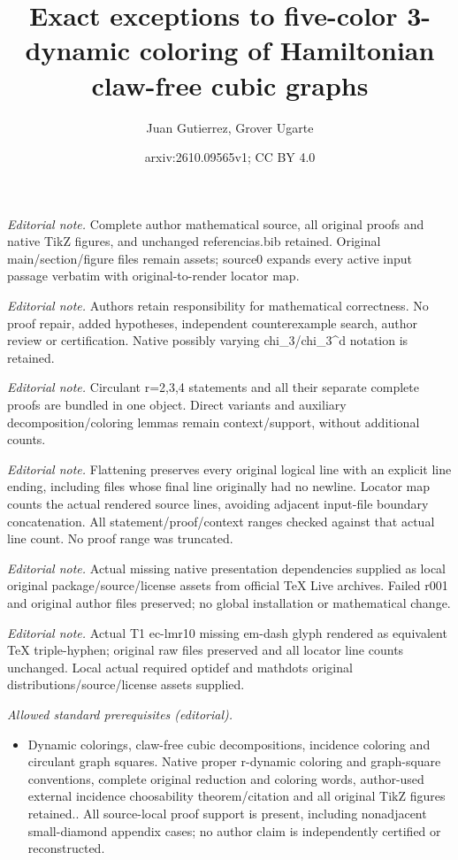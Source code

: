 \documentclass[10pt,a4paper]{article}
\title{Exact exceptions to five-color 3-dynamic coloring of Hamiltonian claw-free cubic graphs}
\author{Juan Gutierrez, Grover Ugarte}
\date{arxiv:2610.09565v1; CC BY 4.0}
\theoremstyle{case}
\numberwithin{subcase}{case}
\begin{document}
\maketitle
\noindent\textit{Editorial note.} Complete author mathematical source, all original proofs and native TikZ figures, and unchanged referencias.bib retained. Original main/section/figure files remain assets; source0 expands every active input passage verbatim with original-to-render locator map.\par\medskip
\noindent\textit{Editorial note.} Authors retain responsibility for mathematical correctness. No proof repair, added hypotheses, independent counterexample search, author review or certification. Native possibly varying chi\_3/chi\_3\textasciicircum{}d notation is retained.\par\medskip
\noindent\textit{Editorial note.} Circulant r=2,3,4 statements and all their separate complete proofs are bundled in one object. Direct variants and auxiliary decomposition/coloring lemmas remain context/support, without additional counts.\par\medskip
\noindent\textit{Editorial note.} Flattening preserves every original logical line with an explicit line ending, including files whose final line originally had no newline. Locator map counts the actual rendered source lines, avoiding adjacent input-file boundary concatenation. All statement/proof/context ranges checked against that actual line count. No proof range was truncated.\par\medskip
\noindent\textit{Editorial note.} Actual missing native presentation dependencies supplied as local original package/source/license assets from official TeX Live archives. Failed r001 and original author files preserved; no global installation or mathematical change.\par\medskip
\noindent\textit{Editorial note.} Actual T1 ec-lmr10 missing em-dash glyph rendered as equivalent TeX triple-hyphen; original raw files preserved and all locator line counts unchanged. Local actual required optidef and mathdots original distributions/source/license assets supplied.\par\medskip
\noindent\textit{Allowed standard prerequisites (editorial).}\begin{itemize}
\item Dynamic colorings, claw-free cubic decompositions, incidence coloring and circulant graph squares. Native proper r-dynamic coloring and graph-square conventions, complete original reduction and coloring words, author-used external incidence choosability theorem/citation and all original TikZ figures retained.. All source-local proof support is present, including nonadjacent small-diamond appendix cases; no author claim is independently certified or reconstructed.
\end{itemize}\medskip
\end{document}
